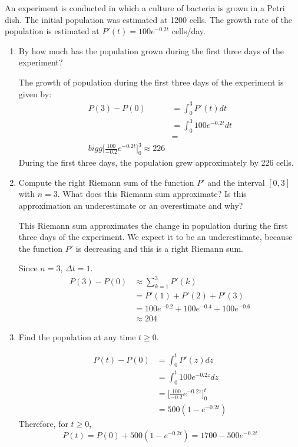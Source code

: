 \documentclass{ximera}
\begin{document}
\begin{example}
An experiment is conducted in which a culture of bacteria is grown in a Petri dish. The initial population was  estimated at 1200 cells. 
The  growth rate of the population is estimated at  $P'(t)=100e^{-0.2 t}$ cells/day.
\begin{enumerate}
\item By how much has the population grown during the first three days of the experiment?
\begin{explanation}
The growth of population during the first three days of the experiment is given by:
\begin{align*}
  P(3)-P(0) &=\int_0^3 P'(t) dt\\
  &=\int_0^3 100 e^{-0.2 t} dt\\
  &=\\bigg[ \frac{100}{-0.2}e^{-0.2 t} \bigg]_0^3\approx 226
\end{align*}
During the first three  days, the population  grew  approximately by 226 cells. 
\end{explanation}

\item 
Compute the right Riemann sum of the function $P'$ and the interval $[0,3]$ with $n=3$.
What does this Riemann sum approximate?  Is this approximation an underestimate or an overestimate and why?


\begin{explanation}
This Riemann sum approximates the change in population during the first three days of the experiment.
We expect it to be an underestimate, because the function $P'$ is decreasing and this is a right Riemann sum.

Since $n=3$,  $\Delta t=1$.
\begin{align*}
  P(3)-P(0) &\approx\sum_{k=1}^3P'(k)\\
  &=P'(1)+P'(2)+P'(3)\\
  &=100e^{-0.2 }+100e^{-0.4}+100e^{-0.6}\\
  &\approx 204
\end{align*}
\end{explanation}
\item Find the population at any time $t\ge0$.
\begin{explanation}
\begin{align*}
  P(t)-P(0)&=\int_0^t P'(z) dz\\
  &=\int_0^t 100 e^{-0.2 z} dz\\
  &=\bigg[ \frac{100}{-0.2}e^{-0.2 z} \bigg]_0^t\\
  &=500\left(1-e^{-0.2 t}\right)
\end{align*}
Therefore, for $t\ge0$,
\[
P(t)=P(0)+500\left(1-e^{-0.2 t}\right)=1700 -500e^{-0.2 t}
\]
\end{explanation}
\end{enumerate}
\end{example}
\end{document}
